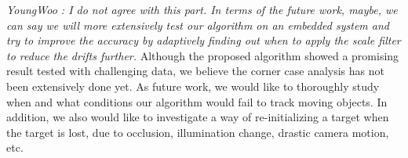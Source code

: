 \documentclass[10pt,twocolumn,letterpaper]{article}
\begin{document}
\textit{YoungWoo : I do not agree with this part. In terms of the future work, maybe,
 we can say we will more extensively test our algorithm on an embedded system and try
 to improve the accuracy by adaptively finding out when to apply the scale filter to reduce the drifts further. }
Although the proposed algorithm showed a promising result tested with
challenging data, we believe the corner case analysis has not been
extensively done yet. As future work, we would like to thoroughly
study when and what conditions our algorithm would fail to track
moving objects. In addition, we also would like to investigate a way
of re-initializing a target when the target is lost, due to occlusion,
illumination change, drastic camera motion, etc.

{\small


}
\end{document}
